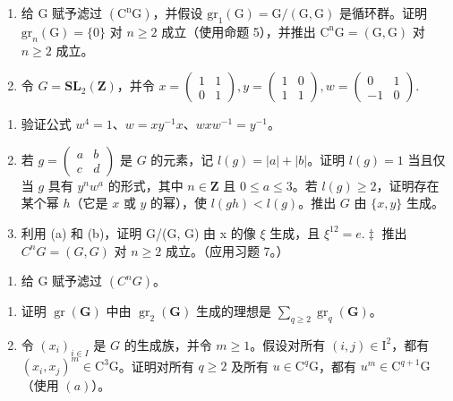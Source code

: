 \begin{enumerate}
\def\labelenumi{\arabic{enumi}.}
\setcounter{enumi}{6}
\item
  给 G 赋予滤过 \((\mathrm{C}^{\mathrm{n}}\mathrm{G})\)，并假设 \(\mathrm{gr}_{1}(\mathrm{G}) = \mathrm{G}/(\mathrm{G}, \mathrm{G})\) 是循环群。证明 \(\mathrm{gr}_{n}(\mathrm{G}) = \{0\}\) 对 \(n \geqslant 2\) 成立（使用命题 5），并推出 \(\mathrm{C}^{\mathrm{n}}\mathrm{G} = (\mathrm{G}, \mathrm{G})\) 对 \(n \geqslant 2\) 成立。
\item
  令 \(G = \mathbf{S}\mathbf{L}_{2}(\mathbf{Z})\)，并令 \(x = \begin{pmatrix} 1 & 1 \\ 0 & 1 \end{pmatrix}, y = \begin{pmatrix} 1 & 0 \\ 1 & 1 \end{pmatrix}, w = \begin{pmatrix} 0 & 1 \\ -1 & 0 \end{pmatrix}.\)
\end{enumerate}

\begin{enumerate}
\def\labelenumi{(\alph{enumi})}
\item
  验证公式 \(w^4 = 1\)、\(w = xy^{-1}x\)、\(wxw^{-1} = y^{-1}\)。
\item
  若 \(g = \begin{pmatrix} a & b \\ c & d \end{pmatrix}\) 是 \(G\) 的元素，记 \(l(g) = |a| + |b|\)。证明 \(l(g) = 1\) 当且仅当 \(g\) 具有 \(y^n w^a\) 的形式，其中 \(n \in \mathbf{Z}\) 且 \(0 \leqslant a \leqslant 3\)。若 \(l(g) \geqslant 2\)，证明存在某个幂 \(h\)（它是 \(x\) 或 \(y\) 的幂），使 \(l(gh) < l(g)\)。推出 \(G\) 由 \(\{x, y\}\) 生成。
\item
  利用 (a) 和 (b)，证明 G/(G, G) 由 x 的像 \(\xi\) 生成，且 \(\xi^{12} = e.\ddagger\) 推出 \(C^{n}G = (G, G)\) 对 \(n \geqslant 2\) 成立。（应用习题 7。）
\end{enumerate}

\begin{enumerate}
\def\labelenumi{\arabic{enumi}.}
\setcounter{enumi}{8}
\tightlist
\item
  给 G 赋予滤过 \((C^{n}G)\)。
\end{enumerate}

\begin{enumerate}
\def\labelenumi{(\alph{enumi})}
\item
  证明 \(\operatorname{gr}(\mathbf{G})\) 中由 \(\operatorname{gr}_2(\mathbf{G})\) 生成的理想是 \(\sum_{q\geqslant 2}\operatorname{gr}_q(\mathbf{G})\)。
\item
  令 \((x_{i})_{i\in I}\) 是 \(G\) 的生成族，并令 \(m\geqslant 1\)。假设对所有 \((i,j)\in \mathrm{I}^2\)，都有 \((x_i,x_j)^m\in \mathrm{C}^3\mathrm{G}\)。证明对所有 \(q\geqslant 2\) 及所有 \(u\in \mathrm{C}^q\mathrm{G}\)，都有 \(u^{m}\in \mathrm{C}^{q + 1}\mathrm{G}\)（使用 \((a)\)）。
\end{enumerate}

